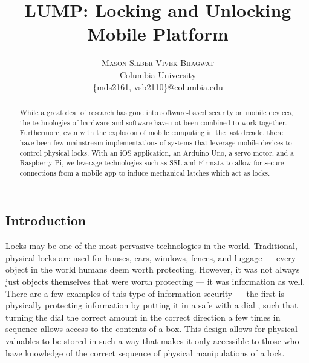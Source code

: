 \documentclass[10pt]{article}
\title{\vspace{-15mm}\fontsize{24pt}{10pt}\selectfont\textbf{LUMP: Locking and Unlocking Mobile Platform}} %
\author{
    \large
    \textsc{Mason Silber \quad Vivek Bhagwat}\\[2mm] %
    \normalsize Columbia University \\ %
    \normalsize \{mds2161, vsb2110\}@columbia.edu %
    \vspace{-5mm}
}
\date{}
\begin{document}
\maketitle %



\begin{multicols}{2} %


\begin{abstract}

While a great deal of research has gone into software-based security on mobile devices, the technologies of hardware and software have not been combined to work together. Furthermore, even with the explosion of mobile computing in the last decade, there have been few mainstream implementations of systems that leverage mobile devices to control physical locks. With an iOS application, an Arduino Uno, a servo motor, and a Raspberry Pi, we leverage technologies such as SSL and Firmata to allow for secure connections from a mobile app to induce mechanical latches which act as locks.

\end{abstract}

\section{Introduction}
Locks may be one of the most pervasive technologies in the world. Traditional, physical locks are used for houses, cars, windows, fences, and luggage --- every object in the world humans deem worth protecting. However, it was not always just objects themselves that were worth protecting --- it was information as well.\\

There are a few examples of this type of information security --- the first is physically protecting information by putting it in a safe with a dial \cite{safestructure}, such that turning the dial the correct amount in the correct direction a few times in sequence allows access to the contents of a box. This design allows for physical valuables to be stored in such a way that makes it only accessible to those who have knowledge of the correct sequence of physical manipulations of a lock. \\


\end{multicols}
\end{document}
